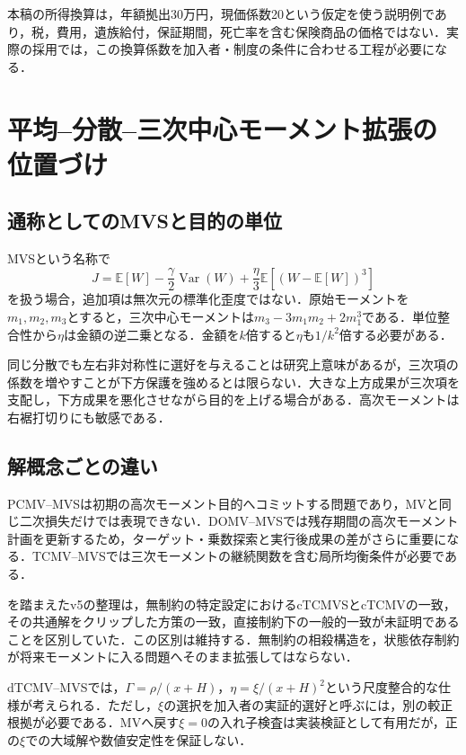 \documentclass[11pt,a4paper]{article}
\numberwithin{equation}{section}
\numberwithin{table}{section}
\numberwithin{figure}{section}
\theoremstyle{plain}
\theoremstyle{definition}
\newcommand{\E}{\mathbb{E}}
\DeclareMathOperator{\Var}{Var}
\begin{document}
本稿の所得換算は，年額拠出30万円，現価係数20という仮定を使う説明例であり，税，費用，遺族給付，保証期間，死亡率を含む保険商品の価格ではない．実際の採用では，この換算係数を加入者・制度の条件に合わせる工程が必要になる．

\FloatBarrier
\section{平均--分散--三次中心モーメント拡張の位置づけ}
\label{app:mvs-extended}
\subsection{通称としてのMVSと目的の単位}
MVSという名称で
\begin{equation}
J=\E[W]-\frac\gamma2\Var(W)+\frac\eta3\E[(W-\E[W])^3]
\end{equation}
を扱う場合，追加項は無次元の標準化歪度ではない．原始モーメントを$m_1,m_2,m_3$とすると，三次中心モーメントは$m_3-3m_1m_2+2m_1^3$である．単位整合性から$\eta$は金額の逆二乗となる．金額を$k$倍すると$\eta$も$1/k^2$倍する必要がある．

同じ分散でも左右非対称性に選好を与えることは研究上意味があるが，三次項の係数を増やすことが下方保護を強めるとは限らない．大きな上方成果が三次項を支配し，下方成果を悪化させながら目的を上げる場合がある．高次モーメントは右裾打切りにも敏感である．

\subsection{解概念ごとの違い}
PCMV--MVSは初期の高次モーメント目的へコミットする問題であり，MVと同じ二次損失だけでは表現できない．DOMV--MVSでは残存期間の高次モーメント計画を更新するため，ターゲット・乗数探索と実行後成果の差がさらに重要になる．TCMV--MVSでは三次モーメントの継続関数を含む局所均衡条件が必要である．

\citet{MuTianYang2019}を踏まえたv5の整理は，無制約の特定設定におけるcTCMVSとcTCMVの一致，その共通解をクリップした方策の一致，直接制約下の一般的一致が未証明であることを区別していた．この区別は維持する．無制約の相殺構造を，状態依存制約が将来モーメントに入る問題へそのまま拡張してはならない．

dTCMV--MVSでは，$\Gamma=\rho/(x+H)$，$\eta=\xi/(x+H)^2$という尺度整合的な仕様が考えられる．ただし，$\xi$の選択を加入者の実証的選好と呼ぶには，別の較正根拠が必要である．MVへ戻す$\xi=0$の入れ子検査は実装検証として有用だが，正の$\xi$での大域解や数値安定性を保証しない．
\end{document}
